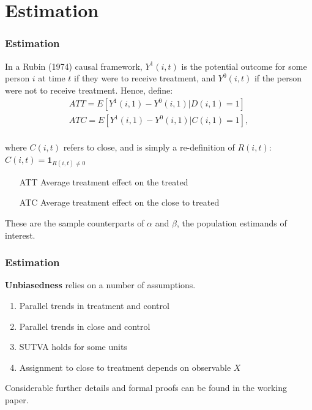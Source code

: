 \documentclass[10pt,letterpaper,subeqn]{beamer}
\begin{document}
\section{Estimation}

\begin{frame}[label=estim3]
  \frametitle{Estimation}
In a Rubin (1974) causal framework, $Y^1(i,t)$ is the potential outcome for some 
person $i$ at time $t$ if they were to receive treatment, and $Y^0(i,t)$ if the 
person were not to receive treatment. Hence, define:
\vspace{4mm}
\begin{eqnarray}
\label{Seqn:estimATT}
ATT=E[Y^1(i,1)-Y^0(i,1)|D(i,1)=1]\  \\
\label{Seqn:estimATC}
ATC=E[Y^1(i,1)-Y^0(i,1)|C(i,1)=1],
\end{eqnarray}
\vspace{4mm} \\
where $C(i,t)$ refers to close, and is simply a re-definition of $R(i,t)$:
$C(i,t)=\mathbf{1}_{R(i,t)\neq 0}$
\vspace{4mm} \\
\begin{enumerate}
\item[ATT] Average treatment effect on the treated
\item[ATC] Average treatment effect on the close to treated
\end{enumerate}
These are the sample counterparts of $\alpha$ and $\beta$, the population 
estimands of interest.

\end{frame}



\begin{frame}[label=estim4]
  \frametitle{Estimation}
\textbf{Unbiasedness} relies on a number of assumptions. \\
\vspace{5mm}
\begin{enumerate}
\item Parallel trends in treatment and control
\item Parallel trends in close and control
\item SUTVA holds for some units
\item Assignment to close to treatment depends on observable $X$
\end{enumerate}
\vspace{3mm}
Considerable further details and formal proofs can be found in the working paper.
\end{frame}
\end{document}
